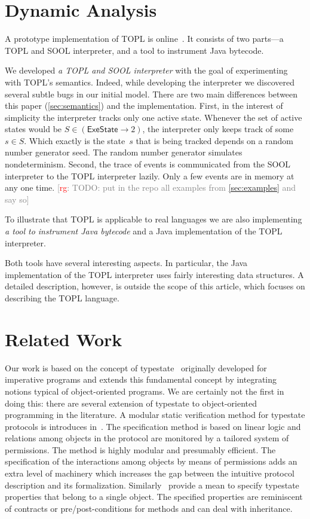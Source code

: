 \documentclass[preprint]{sigplanconf} %
\newcommand{\note}[2]{\textcolor{gray}{[\textcolor{red}{#1}: #2]}}
\newcommand{\rg}[1]{\note{rg}{#1}}
\newcommand{\set}[1]{\ensuremath{\mathsf{#1}}}
\theoremstyle{definition}
\theoremstyle{remark}
\begin{document}
\section{Dynamic Analysis}\label{sec:dynamic} %

A prototype implementation of TOPL is online~\cite{web:topl.prototype}.
It consists of two parts---a TOPL and SOOL interpreter, and a tool to instrument Java bytecode.

We developed \emph{a TOPL and SOOL interpreter} with the goal of experimenting with TOPL's semantics.
Indeed, while developing the interpreter we discovered several subtle bugs in our initial model.
There are two main differences between this paper (\autoref{sec:semantics}) and the implementation.
First, in the interest of simplicity the interpreter tracks only one active state.
Whenever the set of active states would be $S\in(\set{ExeState}\to2)$, the interpreter only keeps track of some $s\in S$.
Which exactly is the state~$s$ that is being tracked depends on a random number generator seed.
The random number generator simulates nondeterminism.
Second, the trace of events is communicated from the SOOL interpreter to the TOPL interpreter lazily.
Only a few events are in memory at any one time.
\rg{TODO: put in the repo all examples from \autoref{sec:examples} and say so}

To illustrate that TOPL is applicable to real languages we are also implementing \emph{a tool to instrument Java bytecode} and a Java implementation of the TOPL interpreter.

Both tools have several interesting aspects.
In particular, the Java implementation of the TOPL interpreter uses fairly interesting data structures.
A detailed description, however, is outside the scope of this article, which focuses on describing the TOPL language.

\section{Related Work}\label{sec:related} %
Our work is based on the concept of typestate~\cite{strom1986} originally developed for imperative programs and extends this fundamental concept by integrating notions typical of object-oriented programs. 
We are certainly not the first in doing this: there are several extension of typestate to object-oriented programming in the literature.
A modular static verification method for typestate protocols is introduces in~\cite{dblp:conf/oopsla/bierhoffa07}. 
The specification method is based on linear logic and relations among objects in the protocol are monitored by a tailored system of permissions. 
The method is highly modular and presumably efficient. The specification of the interactions among objects by means of permissions adds an extra level of machinery which increases the gap between the intuitive protocol description and its formalization. Similarly~\cite{deline2004,dblp:conf/sigsoft/BierhoffA05} provide a mean to specify typestate properties that belong to a single object. The specified properties are reminiscent of contracts or pre/post-conditions for methods and
can deal with inheritance.
\end{document}
